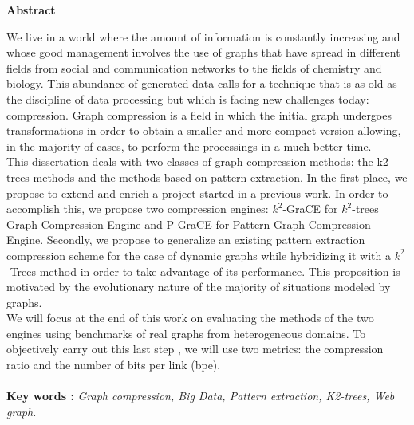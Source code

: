 \newpage
\thispagestyle{plain}
\begin{center}
	\par
	\textbf{
		\vskip 0.5in
		\LARGE 
			Abstract \\[0.15in]
	}
\end{center}
	\par
    
    We live in a world where the amount of information is constantly increasing and whose good management involves the use of graphs that have spread in different fields from social and communication networks to the fields of chemistry and biology. This abundance of generated data calls for a technique that is as old as the discipline of data processing but which is facing new challenges today: compression. Graph compression is a field in which the initial graph undergoes transformations in order to obtain a smaller and more compact version allowing, in the majority of cases, to perform the processings in a much better time.\\

 This dissertation deals with two classes of graph compression methods: the k2-trees methods and the methods based on pattern extraction. In the first place, we propose to extend and enrich a project started in a previous work. In order to accomplish this, we propose two compression engines: $k^2$-GraCE for $k^2$-trees Graph Compression Engine and P-GraCE for Pattern Graph Compression Engine. Secondly, we propose to generalize an existing pattern extraction compression scheme for the case of dynamic graphs while hybridizing it with a $k^2$-Trees method in order to take advantage of its performance. This proposition is motivated by the evolutionary nature of the majority of situations modeled by graphs.\\
 
 We will focus at the end of this work on evaluating the methods of the two engines using benchmarks of real graphs from heterogeneous domains. To objectively carry out this last step , we will use two metrics: the compression ratio and the number of bits per link (bpe). \\\\\textbf{Key words :} \textit{Graph compression, Big Data, Pattern extraction, K2-trees, Web graph.}

\newpage
 

